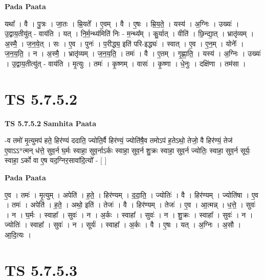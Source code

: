 \documentclass[17pt]{extarticle}
\begin{document}
\textbf{Pada Paata} \newline

यथा᳚ । वै । पु॒त्रः । जा॒तः । म्रि॒यते᳚ । ए॒वम् । वै । ए॒षः । म्रि॒य॒ते॒ । यस्य॑ । अ॒ग्निः । उख्यः॑ । उ॒द्वाय॒तीयु॑त् - वाय॑ति । यत् । नि॒र्म॒न्थ्य॑मिति॑ निः - म॒न्थ्य᳚म् । कु॒र्यात् । वीति॑ । छि॒न्द्या॒त् । भ्रातृ॑व्यम् । अ॒स्मै॒ । ज॒न॒ये॒त् । सः । ए॒व । पुनः॑ । प॒रीद्ध्य॒ इति॑ परि-इद्ध्यः॑ । स्वात् । ए॒व । ए॒न॒म् । योनेः᳚ । ज॒न॒य॒ति॒ । न । अ॒स्मै॒ । भ्रातृ॑व्यम् । ज॒न॒य॒ति॒ । तमः॑ । वै । ए॒तम् । गृ॒ह्णा॒ति॒ । यस्य॑ । अ॒ग्निः । उख्यः॑ । उ॒द्वाय॒तीत्यु॑त् - वाय॑ति । मृ॒त्युः । तमः॑ । कृ॒ष्णम् । वासः॑ । कृ॒ष्णा । धे॒नुः । दक्षि॑णा । तम॑सा ।  \newline




\section*{ TS 5.7.5.2 }

\textbf{TS 5.7.5.2 } \newline
\textbf{Samhita Paata} \newline

-व तमो॑ मृ॒त्युमप॑ हते॒ हिर॑ण्यं ददाति॒ ज्योति॒र्वै हिर॑ण्यं॒ ज्योति॑षै॒व तमोऽप॑ ह॒तेऽथो॒ तेजो॒ वै हिर॑ण्यं॒ तेज॑ ए॒वाऽऽ*त्मन् ध॑त्ते॒ सुव॒र्न घ॒र्मः स्वाहा॒ सुव॒र्नाऽर्कः स्वाहा॒ सुव॒र्न शु॒क्रः स्वाहा॒ सुव॒र्न ज्योतिः॒ स्वाहा॒ सुव॒र्न सूर्यः॒ स्वाहा॒ ऽर्को वा ए॒ष यद॒ग्निर॒सावा॑दि॒त्यो᳚ - [  ] \newline

\textbf{Pada Paata} \newline

ए॒व । तमः॑ । मृ॒त्युम् । अपेति॑ । ह॒ते॒ । हिर॑ण्यम् । द॒दा॒ति॒ । ज्योतिः॑ । वै । हिर॑ण्यम् । ज्योति॑षा । ए॒व । तमः॑ । अपेति॑ । ह॒ते॒ । अथो॒ इति॑ । तेजः॑ । वै । हिर॑ण्यम् । तेजः॑ । ए॒व । आ॒त्मन्न् । ध॒त्ते॒ । सुवः॑ । न । घ॒र्मः । स्वाहा᳚ । सुवः॑ । न । अ॒र्कः । स्वाहा᳚ । सुवः॑ । न । शु॒क्रः । स्वाहा᳚ । सुवः॑ । न । ज्योतिः॑ । स्वाहा᳚ । सुवः॑ । न । सूर्यः॑ । स्वाहा᳚ । अ॒र्कः । वै । ए॒षः । यत् । अ॒ग्निः । अ॒सौ । आ॒दि॒त्यः ।  \newline




\section*{ TS 5.7.5.3 }
\end{document}
